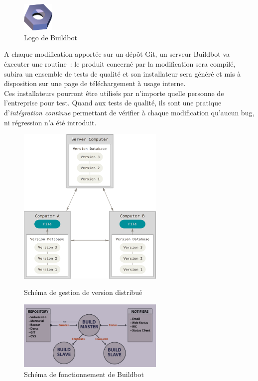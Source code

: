 \paragraph{}
\begin{figure}
  \centering
  \includegraphics[width=1.5cm]{images/buildbot-logo.png}
  \caption{Logo de Buildbot}
\end{figure}
A chaque modification apportée sur un dépôt Git, un serveur Buildbot va éxecuter
une routine~: le produit concerné par la modification sera
compilé, subira un ensemble de tests de qualité et son installateur sera généré 
et mis à disposition sur une page de téléchargement à usage interne.\\
Ces installateurs pourront être utilisés par n'importe quelle personne de l'entreprise
pour test. Quand aux tests de qualité, ils sont une pratique d'\emph{intégration continue} 
permettant de vérifier à chaque modification qu'aucun bug, ni régression n'a été 
introduit\cite{integration-continue}.
\begin{figure}
  \centering
  \begin{minipage}[b]{0.4\textwidth}
    \centering
    \includegraphics[width=7cm]{images/git-diagram.png}
    \caption{Schéma de gestion de version distribué\cite{pro-git}}
  \end{minipage}%
  \hspace{0.09\textwidth}
  \begin{minipage}[b]{0.4\textwidth}
    \centering
    \includegraphics[width=7cm]{images/buildbot-diagram.png}
    \caption{Schéma de fonctionnement de Buildbot\cite{buildbot}}
  \end{minipage}
\end{figure}

